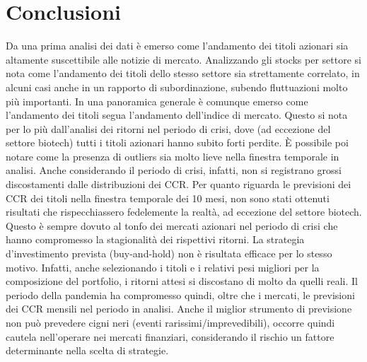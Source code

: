 \documentclass[12pt]{article}
\begin{document}
\section{Conclusioni}
Da una prima analisi dei dati è emerso come l'andamento dei titoli azionari sia altamente suscettibile alle notizie di mercato. Analizzando gli stocks per settore si nota come l'andamento dei titoli dello stesso settore sia strettamente correlato, in alcuni casi anche in un rapporto di subordinazione, subendo fluttuazioni molto più importanti. In una panoramica generale è comunque emerso come l'andamento dei titoli segua l'andamento dell'indice di mercato. Questo si nota per lo più dall'analisi dei ritorni nel periodo di crisi, dove (ad eccezione del settore biotech) tutti i titoli azionari hanno subito forti perdite. È possibile poi notare come la presenza di outliers sia molto lieve nella finestra temporale in analisi. Anche considerando il periodo di crisi, infatti, non si registrano grossi discostamenti dalle distribuzioni dei CCR. Per quanto riguarda le previsioni dei CCR dei titoli nella finestra temporale dei 10 mesi, non sono stati ottenuti risultati che rispecchiassero fedelemente la realtà, ad eccezione del settore biotech. Questo è sempre dovuto al tonfo dei mercati azionari nel periodo di crisi che hanno compromesso la stagionalità dei rispettivi ritorni. La strategia d'investimento prevista (buy-and-hold) non è risultata efficace per lo stesso motivo. Infatti, anche selezionando i titoli e i relativi pesi migliori per la composizione del portfolio, i ritorni attesi si discostano di molto da quelli reali. Il periodo della pandemia ha compromesso quindi, oltre che i mercati, le previsioni dei CCR mensili nel periodo in analisi. Anche il miglior strumento di previsione non può prevedere cigni neri (eventi rarissimi/imprevedibili), occorre quindi cautela nell'operare nei mercati finanziari, considerando il rischio un fattore determinante nella scelta di strategie.
\end{document}
